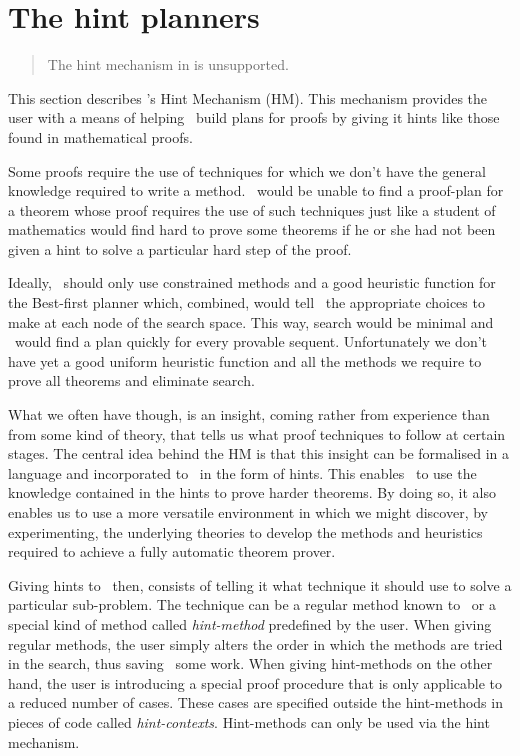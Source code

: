 \section {The hint planners}
\label{hint-planners}

\begin{quote}
The hint mechanism in \clam \version is unsupported.
\end{quote}
This section describes \clam's Hint Mechanism (HM). This
mechanism provides the user with a means of helping \clam\ build plans for
proofs by giving it hints like those found in mathematical proofs.

Some proofs require the use of techniques for which we don't
have the general knowledge required to write a method. \clam\ would be
unable to find a proof-plan for a theorem whose proof requires the use
of such techniques just like a student of mathematics would find hard to
prove some theorems if he or she had not been given a hint to solve a
particular hard step of the proof.

       Ideally, \clam\ should only use constrained methods and a good
heuristic function for the Best-first planner which, combined, would
tell \clam\ the appropriate choices to make at each node of the search
space.  This way, search would be minimal and \clam\ would find a plan
quickly for every provable sequent. Unfortunately we don't have yet a
good uniform heuristic function and all the methods we require to prove
all theorems and eliminate search.

        What we often have though, is an insight, coming rather from
experience than from some kind of theory, that tells us what proof
techniques to follow at certain stages. The central idea behind the HM
is that this insight can be formalised in a language and incorporated to
\clam\ in the form of hints.  This enables \clam\ to use the knowledge
contained in the hints to prove harder theorems.  By doing so, it also
enables us to use a more versatile environment in which we might
discover, by experimenting, the underlying theories to develop the
methods and heuristics required to achieve a fully automatic theorem
prover.

        Giving hints to \clam\ then, consists of telling it what technique
it should use to solve a particular sub-problem. The technique can be a
regular method known to \clam\ or a special kind of method called
{\em hint-method\/} predefined by the user. When giving regular methods, the
user simply alters the order in which the methods are tried in the
search, thus saving \clam\ some work. When giving hint-methods on the
other hand, the user is introducing a special proof procedure that is
only applicable to a reduced number of cases. These cases are specified
outside the hint-methods in pieces of code called {\em hint-contexts}.
Hint-methods can only be used via the hint mechanism.

